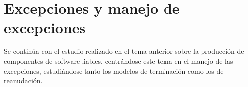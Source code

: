 \section{Excepciones y manejo de excepciones}

Se continúa con el estudio realizado en el tema anterior sobre la producción de
componentes de software fiables, centrándose este tema en el manejo de las
excepciones, estudiándose tanto los modelos de terminación como los de
reanudación.

